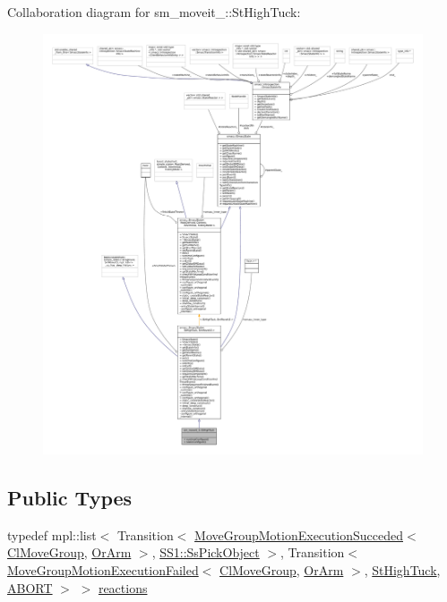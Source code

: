 Collaboration diagram for sm\+\_\+moveit\+\_\+:\+:St\+High\+Tuck\+:
\nopagebreak
\begin{figure}[H]
\begin{center}
\leavevmode
\includegraphics[width=350pt]{structsm__moveit__3_1_1StHighTuck__coll__graph}
\end{center}
\end{figure}
\subsection*{Public Types}
\begin{DoxyCompactItemize}
\item 
typedef mpl\+::list$<$ Transition$<$ \hyperlink{structmove__group__interface__client_1_1MoveGroupMotionExecutionSucceded}{Move\+Group\+Motion\+Execution\+Succeded}$<$ \hyperlink{classmove__group__interface__client_1_1ClMoveGroup}{Cl\+Move\+Group}, \hyperlink{classsm__moveit__3_1_1OrArm}{Or\+Arm} $>$, \hyperlink{structsm__moveit__3_1_1SS1_1_1SsPickObject}{S\+S1\+::\+Ss\+Pick\+Object} $>$, Transition$<$ \hyperlink{structmove__group__interface__client_1_1MoveGroupMotionExecutionFailed}{Move\+Group\+Motion\+Execution\+Failed}$<$ \hyperlink{classmove__group__interface__client_1_1ClMoveGroup}{Cl\+Move\+Group}, \hyperlink{classsm__moveit__3_1_1OrArm}{Or\+Arm} $>$, \hyperlink{structsm__moveit__3_1_1StHighTuck}{St\+High\+Tuck}, \hyperlink{classABORT}{A\+B\+O\+RT} $>$ $>$ \hyperlink{structsm__moveit__3_1_1StHighTuck_a14e727ee48019a59fb9f27737fb57a7e}{reactions}
\end{DoxyCompactItemize}
